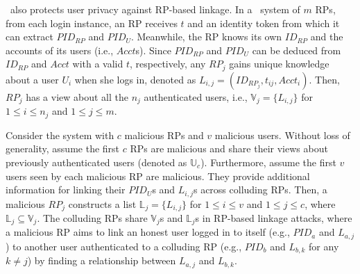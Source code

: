 {{%


\usso~also protects user privacy against RP-based linkage. In a \usso~system of $m$ RPs, from each login instance, an RP receives $t$ %
and an identity token %
from which it can extract $PID_{RP}$ and $PID_U$. Meanwhile, the RP knows its own $ID_{RP}$ and the accounts of its users (i.e., $Acct$s). %
Since $PID_{RP}$ and $PID_U$ can be deduced from $ID_{RP}$ and $Acct$ with a valid $t$, respectively, any $RP_j$ gains unique knowledge about a user $U_i$ when she logs in, denoted as $L_{i, j}=(ID_{RP_j}, t_{ij}, Acct_i)$. Then, $RP_j$ has a view about all the $n_j$ authenticated users, i.e., $\mathbb{V}_j=\{L_{i,j}\}$ for $1 \le i \le n_j$ and $1 \le j \le m$.


Consider the system with $c$ malicious RPs and $v$ malicious users. Without loss of generality, assume the first $c$ RPs are malicious and share their views about previously authenticated users (denoted as $\mathbb{U}_c$). Furthermore, assume the first $v$ users seen by each malicious RP are malicious. They provide additional information for linking their $PID_U$s and $L_{i, j}$s across colluding RPs. Then, a malicious $RP_j$ constructs a list $\mathbb{L}_j=\{L_{i,j}\}$ for $1 \le i \le v$ and $1 \le j \le c$, where $\mathbb{L}_j \subseteq \mathbb{V}_j$. 
The colluding RPs share $\mathbb{V}_j$s and $\mathbb{L}_j$s in RP-based linkage attacks, where a malicious RP aims to link an honest user logged in to itself (e.g., $PID_a$ and $L_{a,j}$) to another user authenticated to a colluding RP (e.g., $PID_b$ and $L_{b,k}$ for any $k \neq j$) by finding a relationship between $L_{a,j}$ and $L_{b,k}$.

}}
